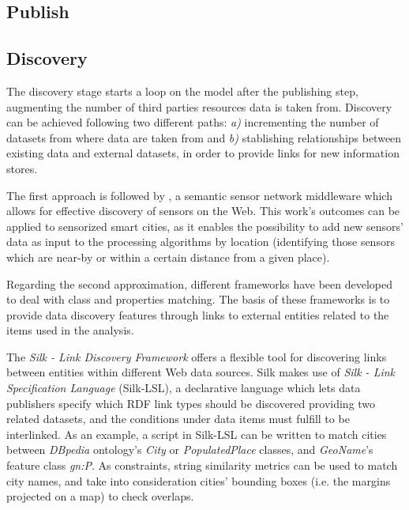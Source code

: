 \subsection{Publish}

\subsection{Discovery}\label{subsec:discovery}

The discovery stage starts a loop on the model after the publishing step, augmenting the number of third parties resources data is taken from. Discovery can be achieved following two different paths: \textit{a)} incrementing the number of datasets from where data are taken from and \textit{b)} stablishing relationships between existing data and external datasets, in order to provide links for new information stores.

The first approach is followed by \cite{pschorr2010sensor}, a semantic sensor network middleware which allows for effective discovery of sensors on the Web. This work's outcomes can be applied to sensorized smart cities, as it enables the possibility to add new sensors' data as input to the processing algorithms by location (identifying those sensors which are near-by or within a certain distance from a given place).

Regarding the second approximation, different frameworks have been developed to deal with class and properties matching. The basis of these frameworks is to provide data discovery features through links to external entities related to the items used in the analysis.

The \textit{Silk - Link Discovery Framework} \cite{volz2009silk} offers a flexible tool for discovering links between entities within different Web data sources. Silk makes use of \textit{Silk - Link Specification Language} (Silk-LSL), a declarative language which lets data publishers specify which RDF link types should be discovered providing two related datasets, and the conditions under data items must fulfill to be interlinked. As an example, a script in Silk-LSL can be written to match cities between \textit{DBpedia} ontology's \textit{City} or \textit{PopulatedPlace} classes, and \textit{GeoName}'s feature class \textit{gn:P}. As constraints, string similarity metrics can be used to match city names, and take into consideration cities' bounding boxes (i.e. the margins projected on a map) to check overlaps.

